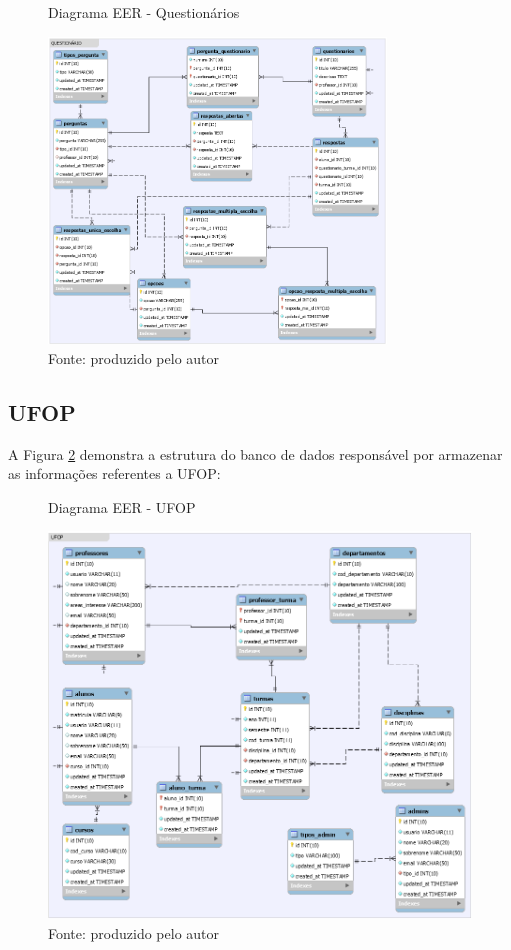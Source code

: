 \documentclass[
  12pt,       %
  openright,      %
  oneside,      %
  a4paper,      %
  english,      %
  french,        %
  spanish,     %
  brazil        %
  ]{abntex2-decsi}
\begin{document}
    \begin{figure}[h]
        \centering
        \caption{Diagrama EER - Questionários}
        \includegraphics[width=0.8\textwidth]{img/questionario_eer}
        \caption*{Fonte: produzido pelo autor}
        \label{fig:eer-questionario}
    \end{figure}

    \subsection{UFOP}
	
    A Figura \ref{fig:eer-ufop} demonstra a estrutura do banco de dados responsável por armazenar as informações referentes a UFOP:
    
    \begin{figure}[h]
    \centering
    \caption{Diagrama EER - UFOP}
    \includegraphics[scale=0.8]{img/ufop_eer}
    \caption*{Fonte: produzido pelo autor}
    \label{fig:eer-ufop}
    \end{figure}
\end{document}
